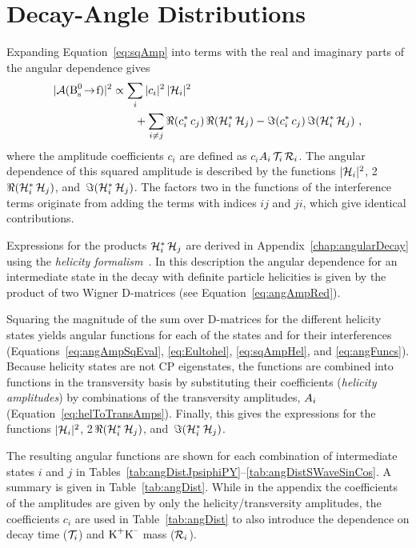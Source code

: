 \section{Decay-Angle Distributions}
\label{sec:pheno_angles}

Expanding Equation~\ref{eq:sqAmp} into terms with the real and imaginary parts of the angular dependence gives
\begin{equation}
  \label{eq:sqAmpExpand}
  \begin{aligned}
    |\mathcal{A}(\Bstof)|^2
      &\propto \sum_i |c_i|^2\, |\angAmp|^2 \\
        &\qquad + \sum_{i\neq j} \Re(c_i^*\,c_j)\, \Re(\angAmp^*\,\angAmp[j])
                               - \Im(c_i^*\,c_j)\, \Im(\angAmp^*\,\angAmp[j]) \ ,
  \end{aligned}
\end{equation}
where the amplitude coefficients $c_i$ are defined as $c_i$\textequiv$\Ai\,\timeAmp\,\mKKAmp$. The angular dependence of this squared
amplitude is described by the functions $|\angAmp|^\text{2}$, 2\,$\Re(\angAmp^*\,\angAmp[j])$, and \,$\Im(\angAmp^*\,\angAmp[j])$. The
factors two in the functions of the interference terms originate from adding the terms with indices $ij$ and $ji$, which give identical
contributions.

Expressions for the products $\angAmp[i]^*\,\angAmp[j]$ are derived in Appendix~\ref{chap:angularDecay} using the \emph{helicity
formalism}~\cite{Jacob:1959at,Chung:1971ri,*Richman:1984gh,*Kutschke:1996}. In this description the angular dependence for an intermediate
state in the \BstoJpsiKK{} decay with definite particle helicities is given by the product of two Wigner D-matrices (see
Equation~\ref{eq:angAmpRed}).

Squaring the magnitude of the sum over D-matrices for the different helicity states yields angular functions for each of the states and for
their interferences (Equations~\ref{eq:angAmpSqEval}, \ref{eq:Eultohel}, \ref{eq:sqAmpHel}, and \ref{eq:angFuncs}). Because helicity states
are not CP eigenstates, the functions are combined into functions in the transversity basis by substituting their coefficients
(\emph{helicity amplitudes}) by combinations of the transversity amplitudes, $\Ai$ (Equation~\ref{eq:helToTransAmps}). Finally, this gives
the expressions for the functions $|\angAmp|^\text{2}$, 2\,$\Re(\angAmp^*\,\angAmp[j])$, and \,$\Im(\angAmp^*\,\angAmp[j])$.

The resulting angular functions are shown for each combination of intermediate states $i$ and $j$ in
Tables~\ref{tab:angDistJpsiphiPY}--\ref{tab:angDistSWaveSinCos}. A summary is given in Table~\ref{tab:angDist}. While in the appendix the
coefficients of the amplitudes are given by only the helicity/transversity amplitudes, the coefficients $c_i$ are used in
Table~\ref{tab:angDist} to also introduce the dependence on decay time ($\timeAmp$) and $\KK$ mass ($\mKKAmp$).

